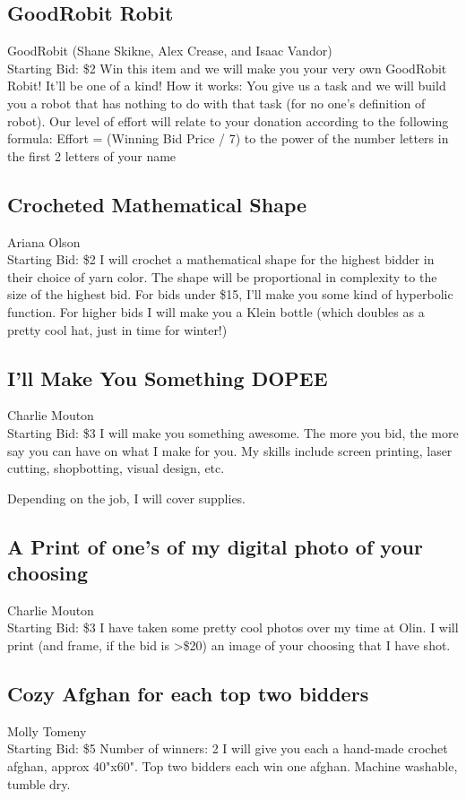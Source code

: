 \documentclass[11pt]{article}
\begin{document}
\subsection{GoodRobit Robit}
GoodRobit (Shane Skikne, Alex Crease, and Isaac Vandor)
\\
Starting Bid: \$2
\newline
Win this item and we will make you your very own GoodRobit Robit! It'll be one of a kind! 
How it works: You give us a task and we will build you a robot that has nothing to do with that task (for no one's  definition of robot). 
Our level of effort will relate to your donation according to the following formula: Effort = (Winning Bid Price / 7) to the power of the number letters in the first 2 letters of your name
\subsection{Crocheted Mathematical Shape}
Ariana Olson
\\
Starting Bid: \$2
\newline
I will crochet a mathematical shape for the highest bidder in their choice of yarn color. The shape will be proportional in complexity to the size of the highest bid. For bids under \$15, I'll make you some kind of hyperbolic function. For higher bids I will make you  a Klein bottle (which doubles as a pretty cool hat, just in time for winter!)
\subsection{I'll Make You Something DOPEE}
Charlie Mouton
\\
Starting Bid: \$3
\newline
I will make you something awesome. The more you bid, the more say you can have on what I make for you. My skills include screen printing, laser cutting, shopbotting, visual design, etc.

Depending on the job, I will cover supplies.
\subsection{A Print of one's of my digital photo of your choosing}
Charlie Mouton
\\
Starting Bid: \$3
\newline
I have taken some pretty cool photos over my time at Olin. I will print (and frame, if the bid is \textgreater \$20) an image of your choosing that I have shot.
\subsection{Cozy Afghan for each top two bidders}
Molly Tomeny
\\
Starting Bid: \$5
\newline
Number of winners: 2
\newline
I will give you each a hand-made crochet afghan, approx 40"x60". Top two bidders each win one afghan. Machine washable, tumble dry.
\end{document}
